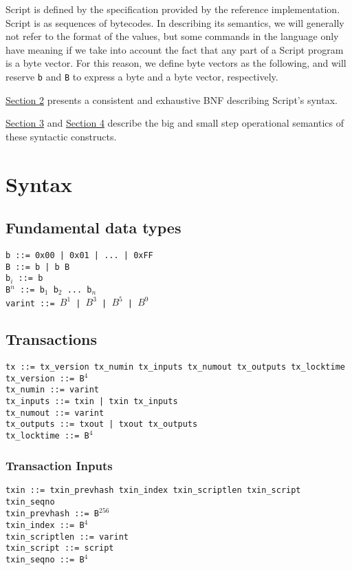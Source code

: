 \documentclass{article}
\begin{document}
Script is defined by the specification provided by the reference implementation. 
Script is  as sequences of bytecodes. In describing its semantics, we will generally not refer to the format of the values, but some commands in the language only have meaning if we take into account the fact that any part of a Script program is a byte vector. For this reason, we define byte vectors as the following, and will reserve \texttt{b} and \texttt{B} to express a byte and a byte vector, respectively.

\hyperlink{SYNTAX}{Section 2} presents a consistent and exhaustive BNF describing Script's syntax.

\hyperlink{OPSEM}{Section 3} and \hyperlink{SmallStep}{Section 4} describe the big and small step operational semantics of these syntactic constructs.

\hypertarget{SYNTAX}{\section{Syntax}}

\subsection{Fundamental data types}
\noindent
\texttt{b ::= 0x00 | 0x01 | ... | 0xFF} \\
\texttt{B ::= b | b B} \\
\texttt{b$_i$ ::= b} \\
\texttt{B$^n$ ::= b$_1$ b$_2$ ... b$_n$} \\
\texttt{varint ::= $B^1$ | $B^3$ | $B^5$ | 	$B^9$}

\subsection{Transactions}
\noindent
\texttt{tx ::= tx\_version tx\_numin tx\_inputs tx\_numout tx\_outputs tx\_locktime  } \\
\texttt{tx\_version ::= B$^4$  } \\
\texttt{tx\_numin ::= varint  } \\
\texttt{tx\_inputs ::= txin | txin tx\_inputs   } \\
\texttt{tx\_numout ::= varint  } \\
\texttt{tx\_outputs ::= txout | txout tx\_outputs  } \\
\texttt{tx\_locktime ::= B$^4$  }

\subsubsection{Transaction Inputs}
\noindent
\texttt{txin ::= txin\_prevhash txin\_index txin\_scriptlen txin\_script txin\_seqno} \\
\texttt{txin\_prevhash ::= B$^{256}$} \\
\texttt{txin\_index ::= B$^4$} \\
\texttt{txin\_scriptlen ::= varint} \\
\texttt{txin\_script ::= script} \\
\texttt{txin\_seqno ::= B$^4$}
\end{document}
